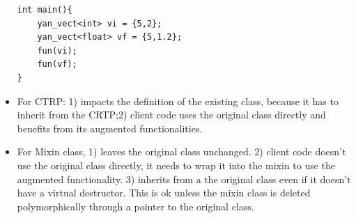 \documentclass[a4paper,11pt,twoside]{book}
\begin{document}
\begin{itemize}
\begin{lstlisting}
int main(){
	yan_vect<int> vi = {5,2};
	yan_vect<float> vf = {5,1.2};
	fun(vi);
	fun(vf);
}
\end{lstlisting}
\item For CTRP: 1) impacts the definition of the existing class, because it has to inherit from the CRTP;2) client code uses the original class directly and benefits from its augmented functionalities.

\item For Mixin class, 1) leaves the original class unchanged. 2) client code doesn’t use the original class directly, it needs to wrap it into the mixin to use the augmented functionality. 3) inherits from a the original class even if it doesn’t have a virtual destructor. This is ok unless the mixin class is deleted polymorphically through a pointer to the original class.

\end{itemize}
\end{document}
